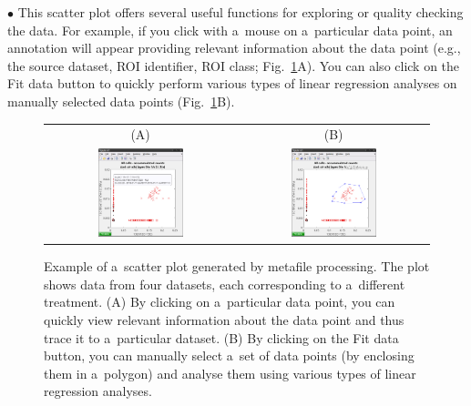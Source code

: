 \documentclass[a4paper, 11pt]{article}
\newcommand{\lans}[1]{{\color{magenta}#1}}
\newcommand\bul{\vskip5pt\noindent$\bullet${ }}
\begin{document}
\bul This scatter plot offers several useful functions for exploring or quality checking the data. For example, if you click with a~mouse on a~particular data point, an annotation will appear providing relevant information about the data point (e.g., the source dataset, ROI identifier, ROI class; Fig.~\ref{fig:metafile-scatterplot}A). You can also click on the \lans{Fit data} button to quickly perform various types of linear regression analyses on manually selected data points (Fig.~\ref{fig:metafile-scatterplot}B).

\begin{figure}[!ht]
\centering
\begin{tabular}{cc}
(A) & (B) \\
\includegraphics[width=0.47\textwidth, valign=t]{figs3/LANS-metafile-scatterplot1}
&
\includegraphics[width=0.47\textwidth, valign=t]{figs3/LANS-metafile-scatterplot2}
\end{tabular}
\caption{\label{fig:metafile-scatterplot}%
Example of a~scatter plot generated by metafile processing.  The plot shows data from four datasets, each corresponding to a~different treatment. (A) By clicking on a~particular data point, you can quickly view relevant information about the data point and thus trace it to a~particular dataset. (B) By clicking on the \lans{Fit data} button, you can manually select a~set of data points (by enclosing them in a~polygon) and analyse them using various types of linear regression analyses. }
\end{figure}
\end{document}
